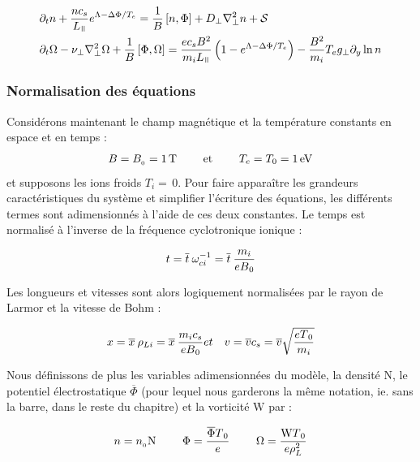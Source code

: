 \begin{refsection}
\begin{align}
\label{2-eqContinuiteMoyenne}
&\partial_t n + \frac{nc_s}{L_\para}e^{\Lambda-\Delta \Phi/T_e} =
\frac{1}{B}\left[n,\Phi\right] + D_\perp\nabla^2_\perp n + \mathcal{S}\\
&\partial_{t}\Omega - \nu_\perp
\nabla_\perp^2\Omega+
\frac{1}{B}\left[\Phi,\Omega\right]=\frac{ec_sB^2}{m_iL_\para}\left(1-e^{\Lambda-\Delta
\Phi/T_e}\right) -\frac{B^2}{m_i}T_eg_\perp\partial_y\ln n
\label{2-eqCourantMoyenne}
\end{align}
 
\subsubsection{Normalisation des équations}

Considérons maintenant le champ magnétique et la température constants en espace
et en temps :
\begin{equation}
B=B_{{_{0}}}=1\,\text{T~~~~~~~et~~~~~~~}T_e=T_0=1\,\text{eV}
\end{equation}
et supposons les
ions froids $T_i=\,$0.
Pour faire apparaître les grandeurs caractéristiques du système et simplifier
l'écriture des équations, les différents termes sont adimensionnés à
l'aide de ces deux constantes. Le temps est normalisé à l'inverse de la
fréquence cyclotronique ionique :

\begin{equation}
t = \overline{t}\:\omega_{ci}^{{-1}} =
\overline{t}\:\frac{m_i}{eB{_{0}}}
\end{equation}

Les longueurs et vitesses sont alors logiquement normalisées par le rayon de
Larmor et la vitesse de Bohm :

\begin{eqnarray}
x = \overline{x}\:\rho_{Li} =
\overline{x}\:\frac{m_ic_s}{eB{_{0}}} &
et &
v=\overline{v}c_s=\overline{v}\sqrt{\frac{eT{_{0}}}{m_i}}
\end{eqnarray}

Nous définissons de plus les variables adimensionnées du modèle, la densité
$\text{N}$, le potentiel électrostatique $\overline{\Phi}$ (pour lequel nous
garderons la même notation, ie. sans la barre, dans le reste du chapitre) et la
vorticité $\text{W}$ par :

\begin{eqnarray}
n = n_{{_{0}}}\text{N} \text{~~~~~~~} \Phi=\frac{\overline{\Phi}
T{_{0}}}{e}
\text{~~~~~~~} \Omega=\frac{\text{W} T{_{0}}}{e\rho_L^2}
\end{eqnarray}


\end{refsection}
